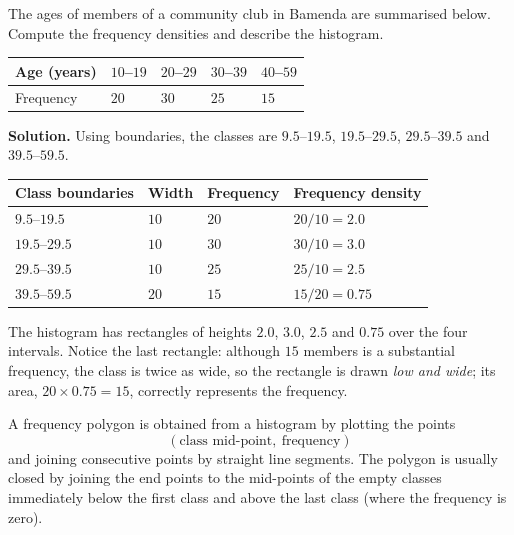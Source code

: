 \documentclass[11pt]{article}
\newcommand{\cle}[1]{{\popxbold\color{popdark}#1}}
\newcounter{popsec}
\newcounter{popsub}
\newcommand{\courssub}[1]{%
  \stepcounter{popsub}%
  \par\vspace{9pt}\noindent{\popxbold\fontsize{11.5}{13}\selectfont\color{popink}{\color{poporange}\thepopsec.\thepopsub}\hspace{6pt}#1}\par\nopagebreak\vspace{4pt}
}
\begin{document}
\begin{exoresolu}
The ages of members of a community club in Bamenda are summarised below. Compute the frequency densities and describe the histogram.
\begin{center}
\begin{tabularx}{\linewidth}{|l|X|X|X|X|}
\hline
\rowcolor{popblueL} Age (years) & $10$--$19$ & $20$--$29$ & $30$--$39$ & $40$--$59$ \\
\hline
Frequency & $20$ & $30$ & $25$ & $15$ \\
\hline
\end{tabularx}
\end{center}
\tcblower
\textbf{Solution.} Using boundaries, the classes are $9.5$--$19.5$, $19.5$--$29.5$, $29.5$--$39.5$ and $39.5$--$59.5$.
\begin{center}
\begin{tabularx}{\linewidth}{|l|X|X|X|}
\hline
\rowcolor{popblueL} Class boundaries & Width & Frequency & Frequency density \\
\hline
$9.5$--$19.5$ & $10$ & $20$ & $20/10 = 2.0$ \\
\hline
$19.5$--$29.5$ & $10$ & $30$ & $30/10 = 3.0$ \\
\hline
$29.5$--$39.5$ & $10$ & $25$ & $25/10 = 2.5$ \\
\hline
$39.5$--$59.5$ & $20$ & $15$ & $15/20 = 0.75$ \\
\hline
\end{tabularx}
\end{center}
The histogram has rectangles of heights $2.0$, $3.0$, $2.5$ and $0.75$ over the four intervals. Notice the last rectangle: although $15$ members is a substantial frequency, the class is twice as wide, so the rectangle is drawn \emph{low and wide}; its area, $20 \times 0.75 = 15$, correctly represents the frequency.
\end{exoresolu}

\courssub{The Frequency Polygon}

\begin{definition}
A \cle{frequency polygon} is obtained from a histogram by plotting the points
\[
(\text{class mid-point},\ \text{frequency})
\]
and joining consecutive points by straight line segments. The polygon is usually closed by joining the end points to the mid-points of the empty classes immediately below the first class and above the last class (where the frequency is zero).
\end{definition}
\end{document}
